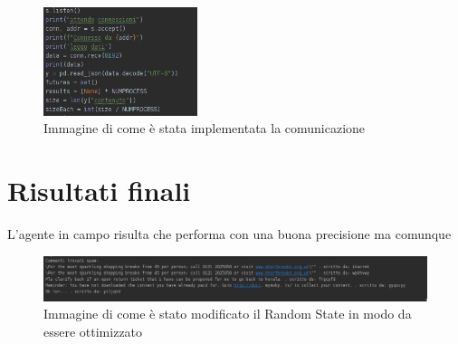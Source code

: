 \documentclass{report}
\begin{document}
    \begin{figure}[h!]
        \centering
        \includegraphics[width =0.4\textwidth]{immagini/socket.png}
        \caption{Immagine di come è stata implementata la comunicazione}

    \end{figure}
    \newpage
    \section{Risultati finali}
    L'agente in campo risulta che performa con una buona precisione ma comunque 

    \begin{figure}[h!]
        \centering
        \includegraphics[width =\textwidth]{immagini/commentiSpam.png}
        \caption{Immagine di come è stato modificato il Random State in modo da essere ottimizzato}

\end{figure}
\end{document}
